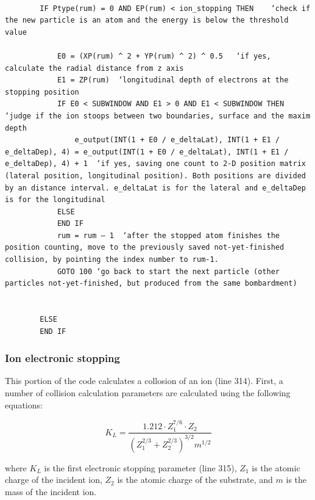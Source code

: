 \documentclass[10pt, reqno]{exam}
\begin{document}
\begin{verbatim}

        IF Ptype(rum) = 0 AND EP(rum) < ion_stopping THEN    ‘check if the new particle is an atom and the energy is below the threshold value
    
            E0 = (XP(rum) ^ 2 + YP(rum) ^ 2) ^ 0.5   ‘if yes, calculate the radial distance from z axis
            E1 = ZP(rum)  ‘longitudinal depth of electrons at the stopping position
            IF E0 < SUBWINDOW AND E1 > 0 AND E1 < SUBWINDOW THEN ‘judge if the ion stoops between two boundaries, surface and the maxim depth
                e_output(INT(1 + E0 / e_deltaLat), INT(1 + E1 / e_deltaDep), 4) = e_output(INT(1 + E0 / e_deltaLat), INT(1 + E1 / e_deltaDep), 4) + 1  ‘if yes, saving one count to 2-D position matrix (lateral position, longitudinal position). Both positions are divided by an distance interval. e_deltaLat is for the lateral and e_deltaDep is for the longitudinal 
            ELSE
            END IF
            rum = rum – 1  ‘after the stopped atom finishes the position counting, move to the previously saved not-yet-finished collision, by pointing the index number to rum-1. 
            GOTO 100 ‘go back to start the next particle (other particles not-yet-finished, but produced from the same bombardment)
    
    
        ELSE
        END IF
\end{verbatim}

\clearpage

\subsubsection{Ion electronic stopping}
\label{sec:electronic stopping}

This portion of the code calculates a collosion of an ion (line 314). First, a number of collision calculation parameters are calculated using the following equations: \par

\begin{equation}
    K_L = \frac{1.212\cdot Z_1^{7/6}\cdot Z_2}{(Z_1^{2/3} + Z_2^{2/3})^{3/2}m^{1/2}}
    \label{eq:first electronic stopping parameter}
\end{equation}

where $K_L$ is the first electronic stopping parameter (line 315), $Z_1$ is the atomic charge of the incident ion, $Z_2$ is the atomic charge of the substrate, and $m$ is the mass of the incident ion. \par
\end{document}
